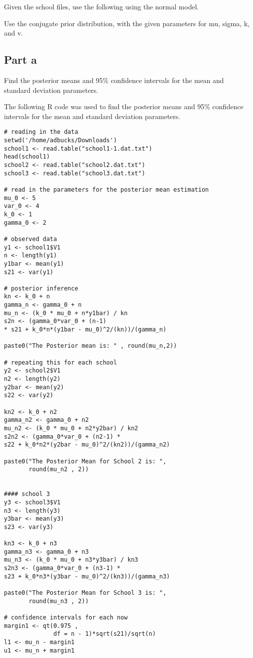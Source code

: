 \documentclass[12pt, letterpaper]{article}
\begin{document}
Given the school files, use the following using the normal model. 

Use the conjugate prior distribution, with the given parameters for mu, sigma, k, and v. 

\subsection{Part a} 

Find the posterior means and 95\% confidence intervals for the mean and standard deviation parameters. 

The following R code was used to find the posterior means and 95\% confidence intervals for the mean and standard deviation parameters. 

\begin{verbatim}
# reading in the data 
setwd('/home/adbucks/Downloads')
school1 <- read.table("school1-1.dat.txt")
head(school1)
school2 <- read.table("school2.dat.txt")
school3 <- read.table("school3.dat.txt")

# read in the parameters for the posterior mean estimation 
mu_0 <- 5
var_0 <- 4
k_0 <- 1
gamma_0 <- 2

# observed data 
y1 <- school1$V1
n <- length(y1)
y1bar <- mean(y1)
s21 <- var(y1)

# posterior inference 
kn <- k_0 + n
gamma_n <- gamma_0 + n
mu_n <- (k_0 * mu_0 + n*y1bar) / kn
s2n <- (gamma_0*var_0 + (n-1) 
* s21 + k_0*n*(y1bar - mu_0)^2/(kn))/(gamma_n)

paste0("The Posterior mean is: " , round(mu_n,2))

# repeating this for each school 
y2 <- school2$V1
n2 <- length(y2)
y2bar <- mean(y2)
s22 <- var(y2)

kn2 <- k_0 + n2
gamma_n2 <- gamma_0 + n2
mu_n2 <- (k_0 * mu_0 + n2*y2bar) / kn2
s2n2 <- (gamma_0*var_0 + (n2-1) *
s22 + k_0*n2*(y2bar - mu_0)^2/(kn2))/(gamma_n2)

paste0("The Posterior Mean for School 2 is: ",
       round(mu_n2 , 2))


#### school 3 
y3 <- school3$V1
n3 <- length(y3)
y3bar <- mean(y3)
s23 <- var(y3)

kn3 <- k_0 + n3
gamma_n3 <- gamma_0 + n3
mu_n3 <- (k_0 * mu_0 + n3*y3bar) / kn3
s2n3 <- (gamma_0*var_0 + (n3-1) *
s23 + k_0*n3*(y3bar - mu_0)^2/(kn3))/(gamma_n3)

paste0("The Posterior Mean for School 3 is: ",
       round(mu_n3 , 2))

# confidence intervals for each now 
margin1 <- qt(0.975 , 
              df = n - 1)*sqrt(s21)/sqrt(n)
l1 <- mu_n - margin1
u1 <- mu_n + margin1


\end{verbatim}
\end{document}
